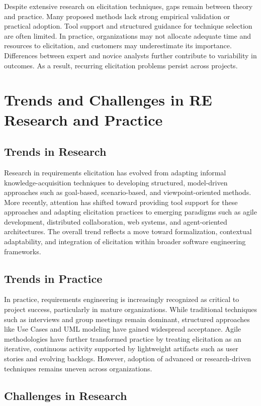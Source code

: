 Despite extensive research on elicitation techniques, gaps remain between theory and practice. Many proposed methods lack strong empirical validation or practical adoption. Tool support and structured guidance for technique selection are often limited. In practice, organizations may not allocate adequate time and resources to elicitation, and customers may underestimate its importance. Differences between expert and novice analysts further contribute to variability in outcomes. As a result, recurring elicitation problems persist across projects.

\section{Trends and Challenges in RE Research and Practice}
\subsection{Trends in Research}

Research in requirements elicitation has evolved from adapting informal knowledge-acquisition techniques to developing structured, model-driven approaches such as goal-based, scenario-based, and viewpoint-oriented methods. More recently, attention has shifted toward providing tool support for these approaches and adapting elicitation practices to emerging paradigms such as agile development, distributed collaboration, web systems, and agent-oriented architectures. The overall trend reflects a move toward formalization, contextual adaptability, and integration of elicitation within broader software engineering frameworks.

\subsection{Trends in Practice}

In practice, requirements engineering is increasingly recognized as critical to project success, particularly in mature organizations. While traditional techniques such as interviews and group meetings remain dominant, structured approaches like Use Cases and UML modeling have gained widespread acceptance. Agile methodologies have further transformed practice by treating elicitation as an iterative, continuous activity supported by lightweight artifacts such as user stories and evolving backlogs. However, adoption of advanced or research-driven techniques remains uneven across organizations.

\subsection{Challenges in Research}

